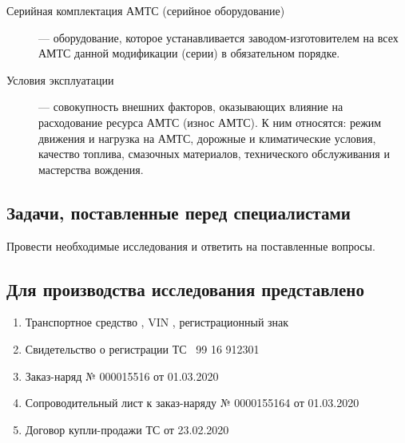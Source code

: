 \begin{description}
\item[Серийная комплектация  АМТС (серийное оборудование)] --- оборудование, которое устанавливается заводом-изготовителем на всех АМТС данной модификации (серии) в обязательном порядке. 

\item[Условия эксплуатации] --- совокупность внешних факторов, оказывающих влияние на расходование ресурса АМТС (износ АМТС). К ним относятся: режим движения и нагрузка на АМТС, дорожные и климатические условия, качество топлива, смазочных материалов, технического обслуживания и мастерства вождения. 


\end{description}

\subsection{Задачи, поставленные перед специалистами}

Провести необходимые исследования и ответить на поставленные вопросы.

\subsection{Для производства исследования представлено}

\begin{enumerate}
 \item Транспортное средство , VIN \vin, регистрационный знак 
  \item Свидетельство о регистрации ТС \, 99 16 912301
 \item Заказ-наряд № 000015516 от 01.03.2020
 \item Сопроводительный лист к заказ-наряду № 0000155164 от 01.03.2020
 \item Договор купли-продажи ТС от 23.02.2020
\end{enumerate}
%
%

%





